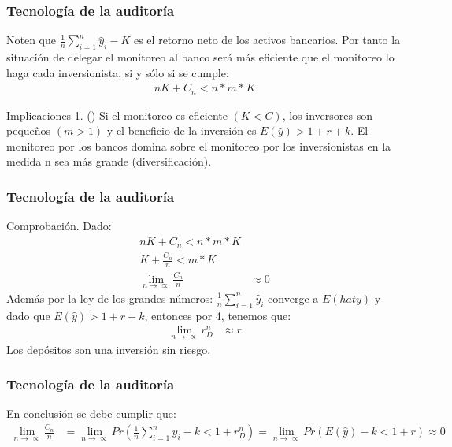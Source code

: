 \begin{frame}
\frametitle{{\normalsize Tecnología de la auditoría} {}}

Noten que $\frac{1}{n}\sum_{i=1}^{n}\hat{y}_{i}-K $ es el retorno neto de los activos bancarios. Por tanto la situación de delegar el monitoreo al banco será más eficiente que el monitoreo lo haga cada inversionista, si y sólo si se cumple:
\begin{align}
nK+C_{n}<n*m*K
\end{align}
\begin{block} {Implicaciones 1. (\cite{Diamond1984})}
	Si el monitoreo es eficiente $(K<C)$, los inversores son pequeños $(m>1) $ y el beneficio de la inversión es $ E(\hat{y})>1+r+k$. El monitoreo por los bancos domina sobre el monitoreo por los inversionistas en la medida n sea más grande (diversificación). 
\end{block}
\end{frame}


\begin{frame}
    \frametitle{{\normalsize Tecnología de la auditoría} {}}
    
   Comprobación. Dado:
    \begin{align}
   nK+C_{n}<n*m*K \nonumber\\
   K+\frac{C_{n}}{n}<m*K\nonumber\\
   \lim_{n\rightarrow\propto}\frac{C_{n}}{n}&\approx 0
   \end{align}
    Además por la ley de los grandes números: $\frac{1}{n}\sum_{i=1}^{n}\hat{y}_{i} $ converge a $E(hat{y})$ y dado que $ E(\hat{y})>1+r+k$, entonces por 4, tenemos que:
     \begin{align}
    \lim_{n\rightarrow\propto}r_{D}^{n}&\approx r
    \end{align}
    Los depósitos son una inversión sin riesgo.
   
\end{frame}

\begin{frame}
    \frametitle{{\normalsize Tecnología de la auditoría} {}}
    En conclusión se debe cumplir que:
    \begin{align}
    \lim_{n\rightarrow\propto}\frac{C_{n}}{n}&=\lim_{n\rightarrow\propto}Pr(\frac{1}{n}\sum_{i=1}^{n}\hat{y}_{i}-k<1+r_{D}^{n})=\lim_{n\rightarrow\propto}Pr(E(\hat{y})-k<1+r)\approx 0
    \end{align}
\end{frame}